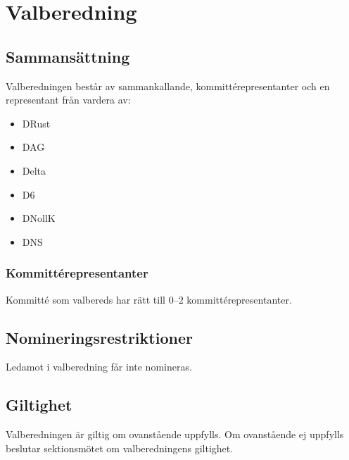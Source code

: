 \section{Valberedning}
\subsection{Sammansättning}
Valberedningen består av sammankallande, kommittérepresentanter och
en representant från vardera av:
\begin{itemize}
  \item DRust
  \item DAG 
  \item Delta 
  \item D6 
  \item DNollK
  \item DNS
\end{itemize}
\subsubsection{Kommittérepresentanter}
Kommitté som valbereds har rätt till 0–2 kommittérepresentanter.
\subsection{Nomineringsrestriktioner}
Ledamot i valberedning får inte nomineras.
\subsection{Giltighet}
Valberedningen är giltig om ovanstående uppfylls. Om ovanstående ej uppfylls 
beslutar sektionsmötet om valberedningens giltighet.
\newpage

